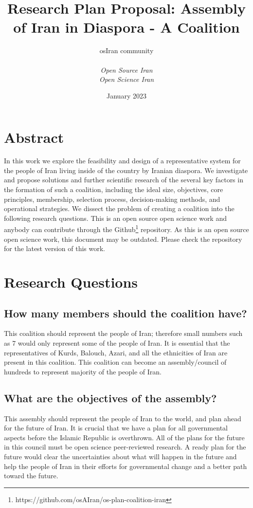 \documentclass{IEEEtran}
\title{ \Huge \textbf{Research Plan Proposal: Assembly of Iran in Diaspora 
- A Coalition } \\[0.5cm]}
\author{
\begin{tabular}{ll}
osIran community
\end{tabular} \bigskip \\

\textit{Open Source Iran} \\
\textit{Open Science Iran}\\
}
\date{January 2023}
\newcommand{\note}[1]{\todo[inline]{#1}}
\begin{document}
\maketitle




\section{Abstract}

In this work we explore the feasibility and design of a representative system for the people 
of Iran living inside of the country by Iranian diaspora. We investigate and propose solutions and 
further scientific 
research of the
 several key factors in the formation of 
such a coalition, including the ideal size, objectives, core principles, membership, selection process,
 decision-making methods, and operational strategies.
We dissect the problem of creating a coalition into the following research questions.
This is an open source open science work and anybody can contribute through the Github\footnote{https://github.com/osAIran/os-plan-coalition-iran} repository.
As this is an open source open science work, this document may be outdated. Please check the repository for the latest version of this work.

\section{Research Questions}
\subsection{How many members should the coalition have?}
This coalition should represent the people of Iran; therefore small numbers such as 7 would only represent some of the people of Iran. 
It is essential that the representatives of Kurds, Balouch, Azari, and all the ethnicities of Iran are present in this coalition. This coalition can become an assembly/council of hundreds to represent majority of the people of Iran. 

\subsection{What are the objectives of the assembly?}
This assembly should represent the people of Iran to the world, and plan ahead for the future of Iran. It is crucial that we have a plan for all governmental aspects before the Islamic Republic is overthrown. All of the plans for the future in this council must be open science peer-reviewed research. A ready plan for the future would clear the uncertainties about what will happen in the future and help the people of Iran in their efforts for governmental change and a better path toward the future.
\end{document}
